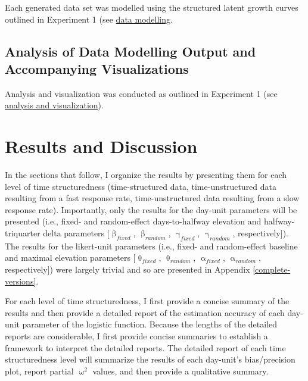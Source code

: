 \documentclass[
12pt, %
twoside,
english]{guelphthesis}
\begin{document}
Each generated data set was modelled using the structured latent growth curves outlined in Experiment 1 (see \protect\hyperlink{data-modelling}{data modelling}.

\hypertarget{analysis-of-data-modelling-output-and-accompanying-visualizations-1}{%
\subsection{Analysis of Data Modelling Output and Accompanying Visualizations}\label{analysis-of-data-modelling-output-and-accompanying-visualizations-1}}

Analysis and visualization was conducted as outlined in Experiment 1 (see \protect\hyperlink{analysis-visualization}{analysis and visualization}).

\hypertarget{results-and-discussion-2}{%
\section{Results and Discussion}\label{results-and-discussion-2}}

In the sections that follow, I organize the results by presenting them for each level of time structuredness (time-structured data, time-unstructured data resulting from a fast response rate, time-unstructured data resulting from a slow response rate). Importantly, only the results for the day-unit parameters will be presented (i.e., fixed- and random-effect days-to-halfway elevation and halfway-triquarter delta parameters {[}\(\upbeta_{fixed}\), \(\upbeta_{random}\), \(\upgamma_{fixed}\), \(\upgamma_{random}\), respectively{]}). The results for the likert-unit parameters (i.e., fixed- and random-effect baseline and maximal elevation parameters {[}\(\uptheta_{fixed}\), \(\uptheta_{random}\), \(\upalpha_{fixed}\), \(\upalpha_{random}\), respectively{]}) were largely trivial and so are presented in Appendix \ref{complete-versions}.

For each level of time structuredness, I first provide a concise summary of the results and then provide a detailed report of the estimation accuracy of each day-unit parameter of the logistic function. Because the lengths of the detailed reports are considerable, I first provide concise summaries to establish a framework to interpret the detailed reports. The detailed report of each time structuredness level will summarize the results of each day-unit's bias/precision plot, report partial \(\upomega^2\) values, and then provide a qualitative summary.
\end{document}
